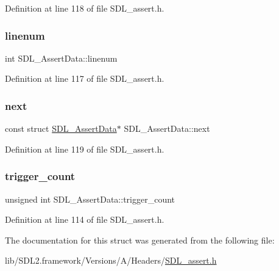 Definition at line 118 of file S\+D\+L\+\_\+assert.\+h.

\mbox{\label{struct_s_d_l___assert_data_ad026d8573970d2402230d5fa3c550b0f}} 
\subsubsection{\texorpdfstring{linenum}{linenum}}
{\footnotesize\ttfamily int S\+D\+L\+\_\+\+Assert\+Data\+::linenum}



Definition at line 117 of file S\+D\+L\+\_\+assert.\+h.

\mbox{\label{struct_s_d_l___assert_data_a2081dcf06dce4df497e423bccddfc099}} 
\subsubsection{\texorpdfstring{next}{next}}
{\footnotesize\ttfamily const struct \mbox{\hyperlink{struct_s_d_l___assert_data}{S\+D\+L\+\_\+\+Assert\+Data}}$\ast$ S\+D\+L\+\_\+\+Assert\+Data\+::next}



Definition at line 119 of file S\+D\+L\+\_\+assert.\+h.

\mbox{\label{struct_s_d_l___assert_data_a230bbcc2d115aab04cf817773e08eb5b}} 
\subsubsection{\texorpdfstring{trigger\_count}{trigger\_count}}
{\footnotesize\ttfamily unsigned int S\+D\+L\+\_\+\+Assert\+Data\+::trigger\+\_\+count}



Definition at line 114 of file S\+D\+L\+\_\+assert.\+h.



The documentation for this struct was generated from the following file\+:\begin{DoxyCompactItemize}
\item 
lib/\+S\+D\+L2.\+framework/\+Versions/\+A/\+Headers/\mbox{\hyperlink{_s_d_l__assert_8h}{S\+D\+L\+\_\+assert.\+h}}\end{DoxyCompactItemize}

